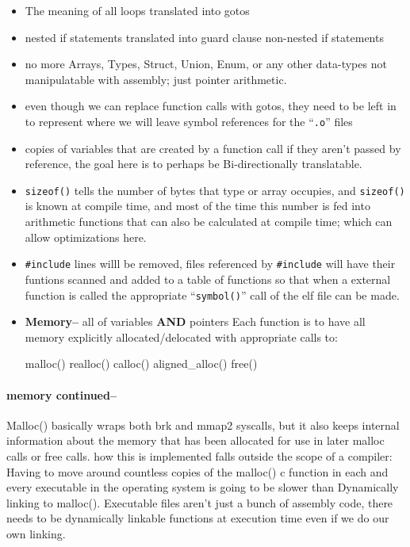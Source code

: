 \begin{itemize}
\item
  The meaning of all loops translated into gotos
\item
  nested if statements translated into guard clause non-nested if
  statements
\item
  no more Arrays, Types, Struct, Union, Enum, or any other data-types
  not manipulatable with assembly; just pointer arithmetic.
\item
  even though we can replace function calls with gotos, they need to be
  left in to represent where we will leave symbol references for the
  ``\texttt{.o}'' files
\item
  copies of variables that are created by a function call if they aren't
  passed by reference, the goal here is to perhaps be Bi-directionally
  translatable.
\item
  \texttt{sizeof()} tells the number of bytes that type or array
  occupies, and \texttt{sizeof()} is known at compile time, and most of
  the time this number is fed into arithmetic functions that can also be
  calculated at compile time; which can allow optimizations here.
\item
  \texttt{\#include} lines willl be removed, files referenced by
  \texttt{\#include} will have their funtions scanned and added to a
  table of functions so that when a external function is called the
  appropriate ``\texttt{symbol()}'' call of the elf file can be made.
\item
  \textbf{Memory--} all of variables \textbf{AND} pointers Each function
  is to have all memory explicitly allocated/delocated with appropriate
  calls to:

  malloc() realloc() calloc() aligned\_alloc() free()
\end{itemize}

\hypertarget{memory-continued}{%
\paragraph{memory continued--}\label{memory-continued}}

Malloc() basically wraps both brk and mmap2 syscalls, but it also keeps
internal information about the memory that has been allocated for use in
later malloc calls or free calls. how this is implemented falls outside
the scope of a compiler: Having to move around countless copies of the
malloc() c function in each and every executable in the operating system
is going to be slower than Dynamically linking to malloc(). Executable
files aren't just a bunch of assembly code, there needs to be
dynamically linkable functions at execution time even if we do our own
linking.

